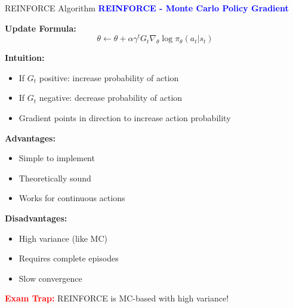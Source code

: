 \documentclass[8pt]{beamer}
\begin{document}
	\begin{frame}{REINFORCE Algorithm}
		\fontsize{6.5}{7.5}\selectfont
		\textcolor{blue}{\textbf{REINFORCE - Monte Carlo Policy Gradient}}
		
		\textbf{Update Formula:}
		\[
		\theta \leftarrow \theta + \alpha \gamma^t G_t \nabla_\theta \log \pi_\theta(a_t|s_t)
		\]
		
		\textbf{Intuition:}
		\begin{itemize}
			\item If $G_t$ positive: increase probability of action
			\item If $G_t$ negative: decrease probability of action
			\item Gradient points in direction to increase action probability
		\end{itemize}
		
		\textbf{Advantages:}
		\begin{itemize}
			\item Simple to implement
			\item Theoretically sound
			\item Works for continuous actions
		\end{itemize}
		
		\textbf{Disadvantages:}
		\begin{itemize}
			\item High variance (like MC)
			\item Requires complete episodes
			\item Slow convergence
		\end{itemize}
		
		\textcolor{red}{\textbf{Exam Trap:}} REINFORCE is MC-based with high variance!
	\end{frame}
	
\end{document}
